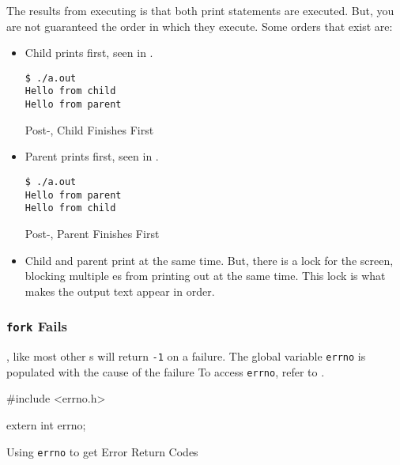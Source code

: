 The results from  executing is that both print statements are executed.
But, you are not guaranteed the order in which they execute.
Some orders that exist are:
\begin{itemize}[noitemsep]
\item Child prints first, seen in .
  \begin{listing}[h!tbp]
\begin{verbatim}
$ ./a.out
Hello from child
Hello from parent
\end{verbatim}
\caption{Post-, Child Finishes First}
\label{lst:fork-1-Child_First}
  \end{listing}

\item Parent prints first, seen in .
  \begin{listing}[h!tbp]
\begin{verbatim}
$ ./a.out
Hello from parent
Hello from child
\end{verbatim}
\caption{Post-, Parent Finishes First}
\label{lst:fork-1-Parent_First}
  \end{listing}

\item Child and parent print at the same time.
  But, there is a lock for the screen, blocking multiple es from printing out at the same time.
  This lock is what makes the output text appear in order.
\end{itemize}

\subsubsection{\texttt{fork} Fails}\label{subsubsec:fork_Fails}
, like most other s will return \texttt{-1} on a failure.
The global variable \texttt{errno} is populated with the cause of the failure
To access \texttt{errno}, refer to .

\begin{listing}[h!tbp]
\begin{csource}
#include <errno.h>

extern int errno;
\end{csource}
\caption{Using \texttt{errno} to get Error Return Codes}
\label{lst:errno}
\end{listing}


